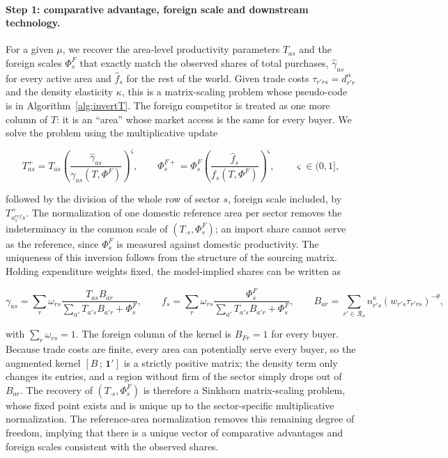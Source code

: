 \paragraph{Step 1: comparative advantage, foreign scale and downstream technology.}
For a given $\mu$, we recover the area-level productivity parameters $T_{as}$ and the foreign scales $\Phi^F_s$ that exactly match the observed shares of total purchases, $\hat\gamma_{as}$ for every active area and $\hat f_s$ for the rest of the world. Given trade costs $\tau_{r'rs}=d_{r'r}^{\alpha}$ and the density elasticity $\kappa$, this is a matrix-scaling problem whose pseudo-code is in Algorithm~\ref{alg:invertT}. The foreign competitor is treated as one more column of $T$: it is an ``area'' whose market access is the same for every buyer. We solve the problem using the multiplicative update

\begin{equation}
T^{+}_{as} = T_{as} \left( \frac{\hat\gamma_{as}} {\gamma_{as}(T,\Phi^F)} \right)^{\varsigma},
\qquad
\Phi^{F+}_{s} = \Phi^F_{s} \left( \frac{\hat f_{s}} {f_{s}(T,\Phi^F)} \right)^{\varsigma},
\qquad \varsigma\in(0,1], \label{eq:app-sinkhorn}
\end{equation}

followed by the division of the whole row of sector $s$, foreign scale included, by $T^{+}_{a^{ref}_s s}$. The normalization of one domestic reference area per sector removes the indeterminacy in the common scale of $(T_{\cdot s},\Phi^F_s)$; an import share cannot serve as the reference, since $\Phi^F_s$ is measured against domestic productivity. The uniqueness of this inversion follows from the structure of the sourcing matrix. Holding expenditure weights fixed, the model-implied shares can be written as

\begin{equation}
\gamma_{as} = \sum_r \omega_{rs} \frac{T_{as}B_{ar}} {\sum_{a'}T_{a's}B_{a'r}+\Phi^F_s}, \qquad
f_{s} = \sum_r \omega_{rs} \frac{\Phi^F_s} {\sum_{a'}T_{a's}B_{a'r}+\Phi^F_s}, \qquad
B_{ar} = \sum_{r'\in\mathcal R_a} n_{r's}^{\kappa}(w_{r's}\tau_{r'rs})^{-\theta},
\end{equation}

with $\sum_r\omega_{rs}=1$. The foreign column of the kernel is $B_{Fr}=1$ for every buyer. Because trade costs are finite, every area can potentially serve every buyer, so the augmented kernel $[B\,;\,\mathbf 1']$ is a strictly positive matrix; the density term only changes its entries, and a region without firm of the sector simply drops out of $B_{ar}$. The recovery of $(T_{\cdot s},\Phi^F_s)$ is therefore a Sinkhorn matrix-scaling problem, whose fixed point exists and is unique up to the sector-specific multiplicative normalization. The reference-area normalization removes this remaining degree of freedom, implying that there is a unique vector of comparative advantages and foreign scales consistent with the observed shares.

